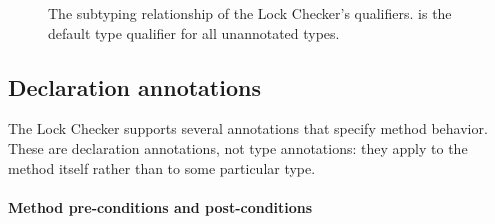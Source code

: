 \begin{figure}
\caption{The subtyping relationship of the Lock Checker's qualifiers.
 is the default type qualifier for all unannotated
types.
}
\label{fig-lock-guardedby-hierarchy}
\end{figure}


\subsection{Declaration annotations\label{lock-declaration-annotations}}

The Lock Checker supports several annotations that specify method behavior.
These are declaration annotations, not type annotations: they apply to the
method itself rather than to some particular type.

\paragraph{Method pre-conditions and post-conditions\label{lock-method-pre-post-conditions}}

